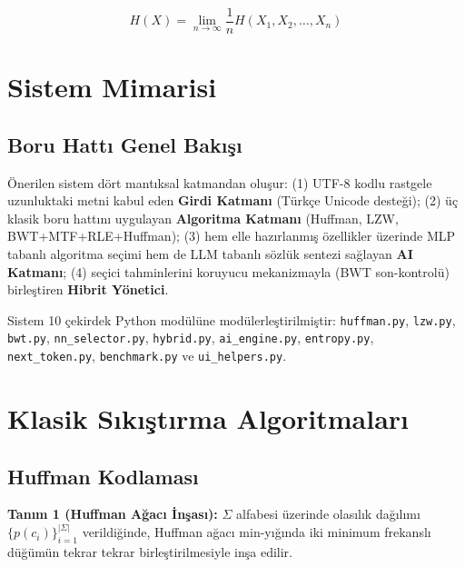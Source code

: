 \documentclass[conference]{IEEEtran}
\begin{document}
\begin{equation}
H(X) = \lim_{n \to \infty} \frac{1}{n} H(X_1, X_2, \ldots, X_n)
\label{eq:cond_entropy}
\end{equation}

\section{Sistem Mimarisi}

\subsection{Boru Hattı Genel Bakışı}

Önerilen sistem dört mantıksal katmandan oluşur: (1) UTF-8 kodlu rastgele uzunluktaki metni kabul eden \textbf{Girdi Katmanı} (Türkçe Unicode desteği); (2) üç klasik boru hattını uygulayan \textbf{Algoritma Katmanı} (Huffman, LZW, BWT+MTF+RLE+Huffman); (3) hem elle hazırlanmış özellikler üzerinde MLP tabanlı algoritma seçimi hem de LLM tabanlı sözlük sentezi sağlayan \textbf{AI Katmanı}; (4) seçici tahminlerini koruyucu mekanizmayla (BWT son-kontrolü) birleştiren \textbf{Hibrit Yönetici}.

Sistem 10 çekirdek Python modülüne modülerleştirilmiştir: \texttt{huffman.py}, \texttt{lzw.py}, \texttt{bwt.py}, \texttt{nn\_selector.py}, \texttt{hybrid.py}, \texttt{ai\_engine.py}, \texttt{entropy.py}, \texttt{next\_token.py}, \texttt{benchmark.py} ve \texttt{ui\_helpers.py}.

\section{Klasik Sıkıştırma Algoritmaları}

\subsection{Huffman Kodlaması}

\noindent\textbf{Tanım 1 (Huffman Ağacı İnşası):} \(\Sigma\) alfabesi üzerinde olasılık dağılımı \(\{p(c_i)\}_{i=1}^{|\Sigma|}\) verildiğinde, Huffman ağacı min-yığında iki minimum frekanslı düğümün tekrar tekrar birleştirilmesiyle inşa edilir.
\end{document}
